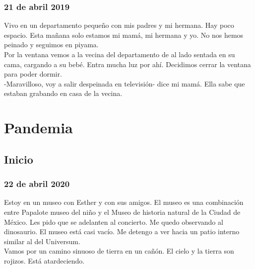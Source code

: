 \documentclass[12pt]{book}
\begin{document}
\subsection*{\hfill 21 de abril 2019}

Vivo en un departamento pequeño con mis padres y mi hermana. Hay poco espacio. Esta mañana solo estamos mi mamá, mi hermana y yo. No nos hemos peinado y seguimos en piyama. 
\\
Por la ventana vemos a la vecina del departamento de al lado sentada en su cama, cargando a su bebé. Entra mucha luz por ahí. Decidimos cerrar la ventana para poder dormir.
\\
-Maravilloso, voy a salir despeinada en televisión- dice mi mamá. Ella sabe que estaban grabando en casa de la vecina.


\chapter{Pandemia}

\section{Inicio}

\subsection*{\hfill 22 de abril 2020}

Estoy en un museo con Esther y con sus amigos. El museo es una combinación entre Papalote museo del niño y el Museo de historia natural de la Ciudad de México. Les pido que se adelanten al concierto. Me quedo observando al dinosaurio. El museo está casi vacío. Me detengo a ver hacia un patio interno similar al del Universum.\\
Vamos por un camino sinuoso de tierra en un cañón. El cielo y la tierra son rojizos. Está atardeciendo.
\end{document}
